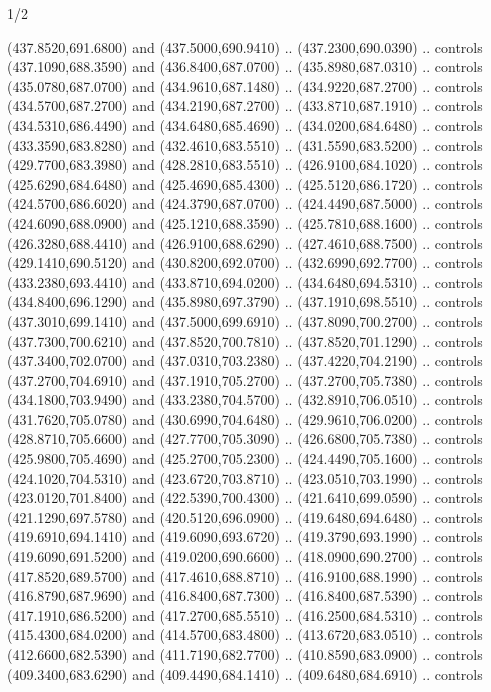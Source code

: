 \begin{flagdescription}{1/2}
\begin{scope}[xshift=0.5\flaglength]
\begin{scope}[scale=0.00745\flagwidth,xshift=-12.1mm,yshift=41.7mm]
\begin{scope}[y=0.80pt, x=0.80pt, yscale=-1, xscale=1, inner sep=0pt, outer sep=0pt]
\begin{scope}[cm={{1.33333,0.0,0.0,-1.33333,(0.0,114.66667)}}]
\begin{scope}[scale=0.100]
  (437.8520,691.6800) and (437.5000,690.9410) .. (437.2300,690.0390) .. controls
  (437.1090,688.3590) and (436.8400,687.0700) .. (435.8980,687.0310) .. controls
  (435.0780,687.0700) and (434.9610,687.1480) .. (434.9220,687.2700) .. controls
  (434.5700,687.2700) and (434.2190,687.2700) .. (433.8710,687.1910) .. controls
  (434.5310,686.4490) and (434.6480,685.4690) .. (434.0200,684.6480) .. controls
  (433.3590,683.8280) and (432.4610,683.5510) .. (431.5590,683.5200) .. controls
  (429.7700,683.3980) and (428.2810,683.5510) .. (426.9100,684.1020) .. controls
  (425.6290,684.6480) and (425.4690,685.4300) .. (425.5120,686.1720) .. controls
  (424.5700,686.6020) and (424.3790,687.0700) .. (424.4490,687.5000) .. controls
  (424.6090,688.0900) and (425.1210,688.3590) .. (425.7810,688.1600) .. controls
  (426.3280,688.4410) and (426.9100,688.6290) .. (427.4610,688.7500) .. controls
  (429.1410,690.5120) and (430.8200,692.0700) .. (432.6990,692.7700) .. controls
  (433.2380,693.4410) and (433.8710,694.0200) .. (434.6480,694.5310) .. controls
  (434.8400,696.1290) and (435.8980,697.3790) .. (437.1910,698.5510) .. controls
  (437.3010,699.1410) and (437.5000,699.6910) .. (437.8090,700.2700) .. controls
  (437.7300,700.6210) and (437.8520,700.7810) .. (437.8520,701.1290) .. controls
  (437.3400,702.0700) and (437.0310,703.2380) .. (437.4220,704.2190) .. controls
  (437.2700,704.6910) and (437.1910,705.2700) .. (437.2700,705.7380) .. controls
  (434.1800,703.9490) and (433.2380,704.5700) .. (432.8910,706.0510) .. controls
  (431.7620,705.0780) and (430.6990,704.6480) .. (429.9610,706.0200) .. controls
  (428.8710,705.6600) and (427.7700,705.3090) .. (426.6800,705.7380) .. controls
  (425.9800,705.4690) and (425.2700,705.2300) .. (424.4490,705.1600) .. controls
  (424.1020,704.5310) and (423.6720,703.8710) .. (423.0510,703.1990) .. controls
  (423.0120,701.8400) and (422.5390,700.4300) .. (421.6410,699.0590) .. controls
  (421.1290,697.5780) and (420.5120,696.0900) .. (419.6480,694.6480) .. controls
  (419.6910,694.1410) and (419.6090,693.6720) .. (419.3790,693.1990) .. controls
  (419.6090,691.5200) and (419.0200,690.6600) .. (418.0900,690.2700) .. controls
  (417.8520,689.5700) and (417.4610,688.8710) .. (416.9100,688.1990) .. controls
  (416.8790,687.9690) and (416.8400,687.7300) .. (416.8400,687.5390) .. controls
  (417.1910,686.5200) and (417.2700,685.5510) .. (416.2500,684.5310) .. controls
  (415.4300,684.0200) and (414.5700,683.4800) .. (413.6720,683.0510) .. controls
  (412.6600,682.5390) and (411.7190,682.7700) .. (410.8590,683.0900) .. controls
  (409.3400,683.6290) and (409.4490,684.1410) .. (409.6480,684.6910) .. controls

\end{scope}
\end{scope}
\end{scope}
\end{scope}
\end{scope}
\end{flagdescription}
